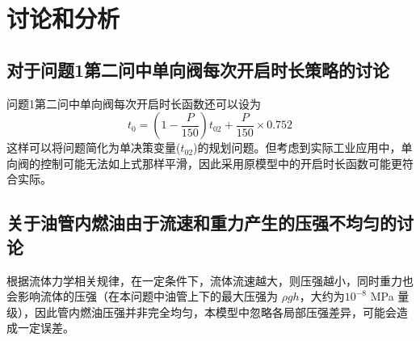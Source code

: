 \documentclass[12pt,a4paper]{article}
\begin{document}
\section{讨论和分析}

\subsection{对于问题1第二问中单向阀每次开启时长策略的讨论}
问题1第二问中单向阀每次开启时长函数还可以设为
\begin{equation}
t_0=(1-\frac{P}{150})t_{02}+\frac{P}{150}\times0.752
\end{equation}
这样可以将问题简化为单决策变量($t_{02}$)的规划问题。但考虑到实际工业应用中，单向阀的控制可能无法如上式那样平滑，因此采用原模型中的开启时长函数可能更符合实际。

\subsection{关于油管内燃油由于流速和重力产生的压强不均匀的讨论}
根据流体力学相关规律，在一定条件下，流体流速越大，则压强越小，同时重力也会影响流体的压强（在本问题中油管上下的最大压强为 $\rho gh$，大约为$10^{-8}$ MPa 量级），因此管内燃油压强并非完全均匀，本模型中忽略各局部压强差异，可能会造成一定误差。
\end{document}
